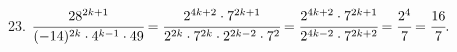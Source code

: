 23. $\cfrac{28^{2k+1}}{(-14)^{2k}\cdot4^{k-1}\cdot49}=\cfrac{2^{4k+2}\cdot7^{2k+1}}{2^{2k}\cdot7^{2k}\cdot2^{2k-2}\cdot7^2}=
\cfrac{2^{4k+2}\cdot7^{2k+1}}{2^{4k-2}\cdot7^{2k+2}}=\cfrac{2^4}{7}=\cfrac{16}{7}.$\\
